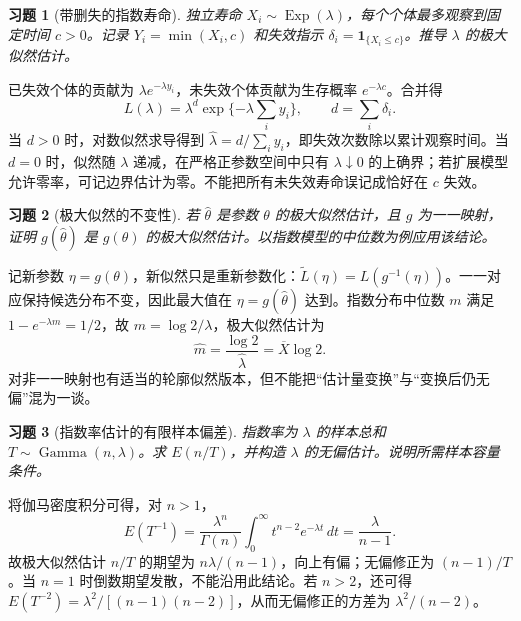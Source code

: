 \documentclass[UTF8,12pt,a4paper,fontset=fandol]{ctexart}
\newtheorem{exercise}{习题}[section]
\begin{document}
\begin{exercise}[带删失的指数寿命]\label{q:B10.4}
独立寿命 $X_i\sim\operatorname{Exp}(\lambda)$，每个个体最多观察到固定时间 $c>0$。记录 $Y_i=\min(X_i,c)$ 和失效指示 $\delta_i=\mathbf1_{\{X_i\le c\}}$。推导 $\lambda$ 的极大似然估计。\par{}
\end{exercise}

\begin{solve}\label{a:B10.4}已失效个体的贡献为 $\lambda e^{-\lambda y_i}$，未失效个体贡献为生存概率 $e^{-\lambda c}$。合并得\[L(\lambda)=\lambda^d\exp\{-\lambda\sum_i y_i\},\qquad d=\sum_i\delta_i.\]当 $d>0$ 时，对数似然求导得到 $\widehat\lambda=d/\sum_i y_i$，即失效次数除以累计观察时间。当 $d=0$ 时，似然随 $\lambda$ 递减，在严格正参数空间中只有 $\lambda\downarrow0$ 的上确界；若扩展模型允许零率，可记边界估计为零。不能把所有未失效寿命误记成恰好在 $c$ 失效。\end{solve}

\begin{exercise}[极大似然的不变性]\label{q:B10.5}
若 $\widehat\theta$ 是参数 $\theta$ 的极大似然估计，且 $g$ 为一一映射，证明 $g(\widehat\theta)$ 是 $g(\theta)$ 的极大似然估计。以指数模型的中位数为例应用该结论。\par{}
\end{exercise}

\begin{solve}\label{a:B10.5}记新参数 $\eta=g(\theta)$，新似然只是重新参数化：$\widetilde L(\eta)=L(g^{-1}(\eta))$。一一对应保持候选分布不变，因此最大值在 $\eta=g(\widehat\theta)$ 达到。指数分布中位数 $m$ 满足 $1-e^{-\lambda m}=1/2$，故 $m=\log2/\lambda$，极大似然估计为\[\widehat m=\frac{\log2}{\widehat\lambda}=\overline X\log2.\]对非一一映射也有适当的轮廓似然版本，但不能把“估计量变换”与“变换后仍无偏”混为一谈。\end{solve}

\begin{exercise}[指数率估计的有限样本偏差]\label{q:B10.6}
指数率为 $\lambda$ 的样本总和 $T\sim\operatorname{Gamma}(n,\lambda)$。求 $E(n/T)$，并构造 $\lambda$ 的无偏估计。说明所需样本容量条件。\par{}
\end{exercise}

\begin{solve}\label{a:B10.6}将伽马密度积分可得，对 $n>1$，\[E(T^{-1})=\frac{\lambda^n}{\Gamma(n)}\int_0^\infty t^{n-2}e^{-\lambda t}\,dt=\frac{\lambda}{n-1}.\]故极大似然估计 $n/T$ 的期望为 $n\lambda/(n-1)$，向上有偏；无偏修正为 $(n-1)/T$。当 $n=1$ 时倒数期望发散，不能沿用此结论。若 $n>2$，还可得 $E(T^{-2})=\lambda^2/[(n-1)(n-2)]$，从而无偏修正的方差为 $\lambda^2/(n-2)$。\end{solve}
\end{document}
